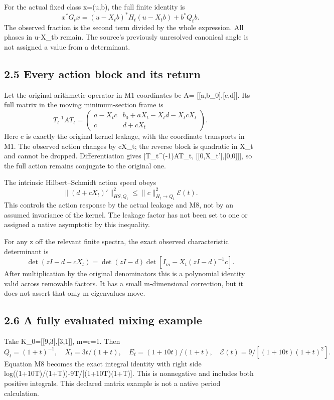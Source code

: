 For the actual fixed class x=(u,b), the full finite identity is \[
 \boxed{x^*G_tx=(u-X_tb)^*H_t(u-X_tb)+b^*Q_tb.}\tag{M15}
\] The observed fraction is the second term divided by the whole expression. All phases in u-X\_tb remain. The source's previously unresolved canonical angle is not assigned a value from a determinant.

\subsection{2.5 Every action block and its return}\label{every-action-block-and-its-return}

Let the original arithmetic operator in M1 coordinates be A= {[}{[}a,b\_0{]},{[}c,d{]}{]}. Its full matrix in the moving minimum-section frame is \[
 \boxed{T_t^{-1}AT_t=
 \begin{pmatrix}
 a-X_tc & b_0+aX_t-X_td-X_tcX_t\\
 c & d+cX_t
 \end{pmatrix}.}\tag{M16}
\] Here c is exactly the original kernel leakage, with the coordinate transports in M1. The observed action changes by cX\_t; the reverse block is quadratic in X\_t and cannot be dropped. Differentiation gives {[}T\_t\^{}(-1)AT\_t, {[}{[}0,X\_t'{]},{[}0,0{]}{]}{]}, so the full action remains conjugate to the original one.

The intrinsic Hilbert--Schmidt action speed obeys \[
 \|(d+cX_t)'\|_{HS,Q_t}^2
 \le\|c\|_{H_t\to Q_t}^2\mathcal E(t).
 \tag{M17}
\] This controls the action response by the actual leakage and M8, not by an assumed invariance of the kernel. The leakage factor has not been set to one or assigned a native asymptotic by this inequality.

For any z off the relevant finite spectra, the exact observed characteristic determinant is \[
 \det(zI-d-cX_t)
 =\det(zI-d)\det[I_m-X_t(zI-d)^{-1}c].
 \tag{M18}
\] After multiplication by the original denominators this is a polynomial identity valid across removable factors. It has a small m-dimensional correction, but it does not assert that only m eigenvalues move.

\subsection{2.6 A fully evaluated mixing example}\label{a-fully-evaluated-mixing-example}

Take K\_0={[}{[}9,3{]},{[}3,1{]}{]}, m=r=1. Then \[
 Q_t=(1+t)^{-1},\quad X_t=3t/(1+t),\quad
 E_t=(1+10t)/(1+t),\quad
 \mathcal E(t)=9/[(1+10t)(1+t)^2].
\] Equation M8 becomes the exact integral identity with right side log((1+10T)/(1+T))-9T/{[}(1+10T)(1+T){]}. This is nonnegative and includes both positive integrals. This declared matrix example is not a native period calculation.

